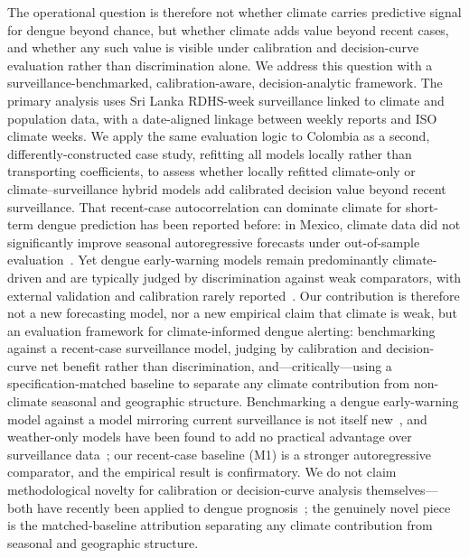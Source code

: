 \documentclass[11pt,a4paper]{article}
\begin{document}
The operational question is therefore not whether climate carries predictive signal for dengue beyond chance, but whether climate adds value beyond recent cases, and whether any such value is visible under calibration and decision-curve evaluation rather than discrimination alone. We address this question with a surveillance-benchmarked, calibration-aware, decision-analytic framework. The primary analysis uses Sri Lanka RDHS-week surveillance linked to climate and population data, with a date-aligned linkage between weekly reports and ISO climate weeks. We apply the same evaluation logic to Colombia as a second, differently-constructed case study, refitting all models locally rather than transporting coefficients, to assess whether locally refitted climate-only or climate--surveillance hybrid models add calibrated decision value beyond recent surveillance. That recent-case autocorrelation can dominate climate for short-term dengue prediction has been reported before: in Mexico, climate data did not significantly improve seasonal autoregressive forecasts under out-of-sample evaluation~\cite{Johansson2016}. Yet dengue early-warning models remain predominantly climate-driven and are typically judged by discrimination against weak comparators, with external validation and calibration rarely reported~\cite{Leung2022,HussainAlkhateeb2021}. Our contribution is therefore not a new forecasting model, nor a new empirical claim that climate is weak, but an evaluation framework for climate-informed dengue alerting: benchmarking against a recent-case surveillance model, judging by calibration and decision-curve net benefit rather than discrimination, and---critically---using a specification-matched baseline to separate any climate contribution from non-climate seasonal and geographic structure. Benchmarking a dengue early-warning model against a model mirroring current surveillance is not itself new~\cite{Lowe2013}, and weather-only models have been found to add no practical advantage over surveillance data~\cite{Benedum2020}; our recent-case baseline (M1) is a stronger autoregressive comparator, and the empirical result is confirmatory. We do not claim methodological novelty for calibration or decision-curve analysis themselves---both have recently been applied to dengue prognosis~\cite{Sangkaew2026}; the genuinely novel piece is the matched-baseline attribution separating any climate contribution from seasonal and geographic structure.

\end{document}
